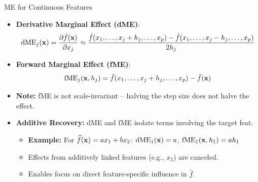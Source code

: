 \documentclass[10pt,compress,t,notes=noshow, xcolor=table]{beamer}
\begin{document}
\begin{frame}{ME for Continuous Features}
\begin{itemize}
\item \textbf{Derivative Marginal Effect (dME)}:
\[
\text{dME}_j(\mathbf{x}) = \frac{\partial \hat{f}(\mathbf{x})}{\partial x_j} \approx \frac{ \hat{f}(x_1, \dots, x_j + h_j, \dots, x_p) -  \hat{f}(x_1, \dots, x_j - h_j, \dots, x_p)}{2h_j}
\]
\item \textbf{Forward Marginal Effect (fME)}:
\[
\text{fME}_j(\mathbf{x}, h_j) = \hat{f}(x_1, \dots, x_j + h_j, \dots, x_p) - \hat{f}(\mathbf{x})
\]

\end{itemize}
\begin{itemize}
\item \textbf{Note:} fME is not scale-invariant -- halving the step size does not halve the effect.


\item \textbf{Additive Recovery:} dME and fME isolate terms involving the target feat.
\begin{itemize}
\item \textbf{Example:} For $\widehat{f}(\mathbf{x}) = a x_1 + b x_2$: 
$\text{dME}_1(\mathbf{x}) = a$, \quad $\text{fME}_1(\mathbf{x}, h_1) = a h_1$
\item Effects from additively linked features (e.g., $x_2$) are canceled.
\item Enables focus on direct feature-specific influence in $\widehat{f}$.
\end{itemize}

\end{itemize}

\end{frame}
\end{document}
